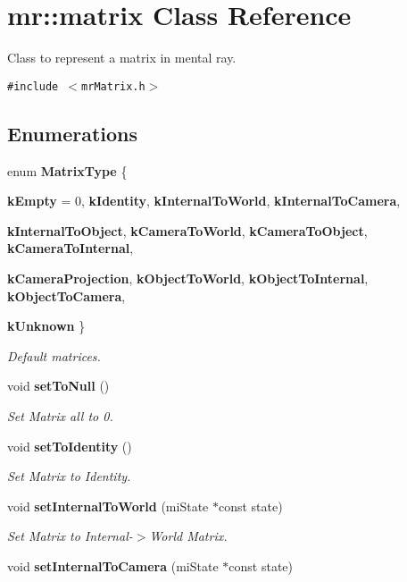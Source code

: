 \section{mr::matrix Class Reference}
\label{classmr_1_1matrix}
Class to represent a matrix in mental ray.  


{\tt \#include $<$mr\-Matrix.h$>$}

\subsection*{Enumerations}
\begin{CompactItemize}
\item 
enum {\bf Matrix\-Type} \{ \par
{\bf k\-Empty} =  0, 
{\bf k\-Identity}, 
{\bf k\-Internal\-To\-World}, 
{\bf k\-Internal\-To\-Camera}, 
\par
{\bf k\-Internal\-To\-Object}, 
{\bf k\-Camera\-To\-World}, 
{\bf k\-Camera\-To\-Object}, 
{\bf k\-Camera\-To\-Internal}, 
\par
{\bf k\-Camera\-Projection}, 
{\bf k\-Object\-To\-World}, 
{\bf k\-Object\-To\-Internal}, 
{\bf k\-Object\-To\-Camera}, 
\par
{\bf k\-Unknown}
 \}
\begin{CompactList}\small\item\em Default matrices. \item\end{CompactList}\item 
void {\bf set\-To\-Null} ()
\begin{CompactList}\small\item\em Set Matrix all to 0. \item\end{CompactList}\item 
void {\bf set\-To\-Identity} ()
\begin{CompactList}\small\item\em Set Matrix to Identity. \item\end{CompactList}\item 
void {\bf set\-Internal\-To\-World} (mi\-State $\ast$const state)
\begin{CompactList}\small\item\em Set Matrix to Internal-$>$World Matrix. \item\end{CompactList}\item 
void {\bf set\-Internal\-To\-Camera} (mi\-State $\ast$const state)

\end{CompactItemize}

